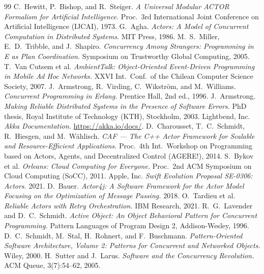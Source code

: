 \documentclass[11pt]{article}
\begin{document}
\begin{thebibliography}{99}
 C.~Hewitt, P.~Bishop, and R.~Steiger.
  \emph{A Universal Modular ACTOR Formalism for Artificial Intelligence.}
  Proc.\ 3rd International Joint Conference on Artificial Intelligence (IJCAI),
  1973.
 G.~Agha.
  \emph{Actors: A Model of Concurrent Computation in Distributed Systems.}
  MIT Press, 1986.
 M.~S.~Miller, E.~D.~Tribble, and J.~Shapiro.
  \emph{Concurrency Among Strangers: Programming in E as Plan Coordination.}
  Symposium on Trustworthy Global Computing, 2005.
 T.~Van Cutsem et al.
  \emph{AmbientTalk: Object-Oriented Event-Driven Programming in Mobile Ad Hoc
  Networks.} XXVI Int.\ Conf.\ of the Chilean Computer Science Society, 2007.
 J.~Armstrong, R.~Virding, C.~Wikstr\"om, and M.~Williams.
  \emph{Concurrent Programming in Erlang.} Prentice Hall, 2nd ed., 1996.
 J.~Armstrong.
  \emph{Making Reliable Distributed Systems in the Presence of Software Errors.}
  PhD thesis, Royal Institute of Technology (KTH), Stockholm, 2003.
 Lightbend, Inc.
  \emph{Akka Documentation.} \url{https://akka.io/docs/}.
 D.~Charousset, T.~C.~Schmidt, R.~Hiesgen, and M.~W\"ahlisch.
  \emph{CAF --- The C++ Actor Framework for Scalable and Resource-Efficient
  Applications.} Proc.\ 4th Int.\ Workshop on Programming based on Actors,
  Agents, and Decentralized Control (AGERE!), 2014.
 S.~Bykov et al.
  \emph{Orleans: Cloud Computing for Everyone.}
  Proc.\ 2nd ACM Symposium on Cloud Computing (SoCC), 2011.
 Apple, Inc.
  \emph{Swift Evolution Proposal SE-0306: Actors.} 2021.
 D.~Bauer.
  \emph{Actor4j: A Software Framework for the Actor Model Focusing on the
  Optimization of Message Passing.} 2018.
 O.~Tardieu et al.
  \emph{Reliable Actors with Retry Orchestration.} IBM Research, 2021.
 R.~G.~Lavender and D.~C.~Schmidt.
  \emph{Active Object: An Object Behavioral Pattern for Concurrent Programming.}
  Pattern Languages of Program Design 2, Addison-Wesley, 1996.
 D.~C.~Schmidt, M.~Stal, H.~Rohnert, and F.~Buschmann.
  \emph{Pattern-Oriented Software Architecture, Volume 2: Patterns for
  Concurrent and Networked Objects.} Wiley, 2000.
 H.~Sutter and J.~Larus.
  \emph{Software and the Concurrency Revolution.} ACM Queue, 3(7):54--62, 2005.

\end{thebibliography}
\end{document}
